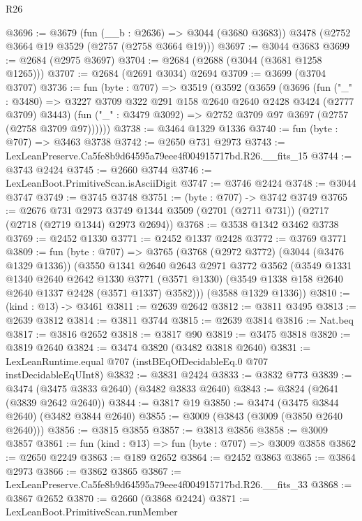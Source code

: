 \begin{lexlean}{R26}
\begin{coremodule}
@3696 := @3679
    (fun (__b : @2636) => @3044 (@3680 @3683))
    @3478
    (@2752 @3664 @19 @3529 (@2757 (@2758 @3664 @19)))
@3697 := @3044 @3683
@3699 := @2684 (@2975 @3697)
@3704 := @2684 (@2688 (@3044 (@3681 @1258 @1265)))
@3707 := @2684 (@2691 @3034) @2694
@3709 := @3699 (@3704 @3707)
@3736 := fun (byte : @707) =>
  @3519
    (@3592
      (@3659
        (@3696
          (fun ("_" : @3480) =>
          @3227 @3709 @322 @291 @158 @2640 @2640 @2428 @3424 (@2777 @3709) @3443)
          (fun ("_" : @3479 @3092) => @2752 @3709 @97 @3697 (@2757 (@2758 @3709 @97))))))
@3738 := @3464 @1329 @1336
@3740 := fun (byte : @707) => @3463 @3738
@3742 := @2650 @731 @2973
@3743 := LexLeanPreserve.Ca5fe8b9d64595a79eee4f004915717bd.R26.__fits_15
@3744 := @3743 @2424
@3745 := @2660 @3744
@3746 := LexLeanBoot.PrimitiveScan.isAsciiDigit
@3747 := @3746 @2424
@3748 := @3044 @3747
@3749 := @3745 @3748
@3751 := (byte : @707) -> @3742 @3749
@3765 := @2676
    @731
    @2973
    @3749
    @1344
    @3509
    (@2701 (@2711 @731))
    (@2717 (@2718 (@2719 @1344) @2973 @2694))
@3768 := @3538 @1342 @3462 @3738
@3769 := @2452 @1330
@3771 := @2452 @1337 @2428
@3772 := @3769 @3771
@3809 := fun (byte : @707) =>
  @3765
    (@3768
      (@2972 @3772)
      (@3044 (@3476 @1329 @1336))
      (@3550
        @1341
        @2640
        @2643
        @2971
        @3772
        @3562
        (@3549
          @1331
          @1340
          @2640
          @2642
          @1330
          @3771
          (@3571 @1330)
          (@3549 @1338 @158 @2640 @2640 @1337 @2428 (@3571 @1337) @3582)))
      (@3588 @1329 @1336))
@3810 := (kind : @13) -> @3461
@3811 := @2639 @2642
@3812 := @3811 @3495
@3813 := @2639 @3812
@3814 := @3811 @3744
@3815 := @2639 @3814
@3816 := Nat.beq
@3817 := @3816 @2652
@3818 := @3817 @90
@3819 := @3475 @3818
@3820 := @3819 @2640
@3824 := @3474 @3820 (@3482 @3818 @2640)
@3831 := LexLeanRuntime.equal @707 (instBEqOfDecidableEq.{0} @707 instDecidableEqUInt8)
@3832 := @3831 @2424
@3833 := @3832 @773
@3839 := @3474 (@3475 @3833 @2640) (@3482 @3833 @2640)
@3843 := @3824 (@2641 (@3839 @2642 @2640))
@3844 := @3817 @19
@3850 := @3474 (@3475 @3844 @2640) (@3482 @3844 @2640)
@3855 := @3009 (@3843 (@3009 (@3850 @2640 @2640)))
@3856 := @3815 @3855
@3857 := @3813 @3856
@3858 := @3009 @3857
@3861 := fun (kind : @13) => fun (byte : @707) => @3009 @3858
@3862 := @2650 @2249
@3863 := @189 @2652
@3864 := @2452 @3863
@3865 := @3864 @2973
@3866 := @3862 @3865
@3867 := LexLeanPreserve.Ca5fe8b9d64595a79eee4f004915717bd.R26.__fits_33
@3868 := @3867 @2652
@3870 := @2660 (@3868 @2424)
@3871 := LexLeanBoot.PrimitiveScan.runMember

\end{coremodule}
\end{lexlean}
